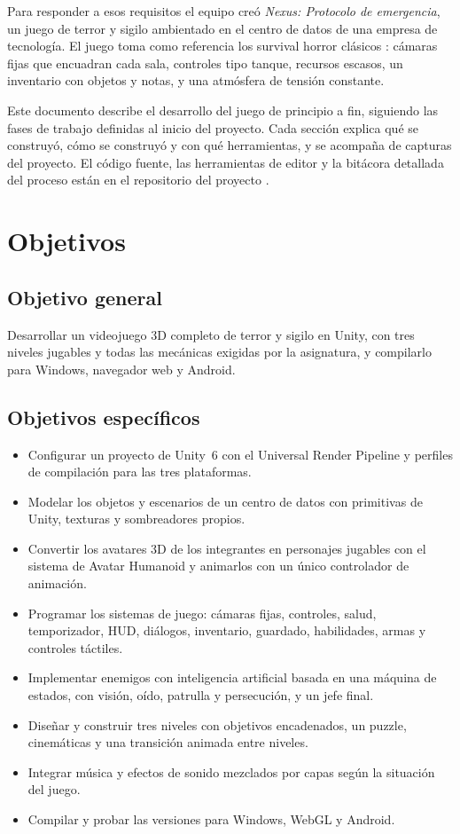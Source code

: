 \documentclass[stu,letterpaper,12pt,donotrepeattitle,floatsintext]{apa7}
\begin{document}
Para responder a esos requisitos el equipo creó \textit{Nexus: Protocolo de emergencia}, un juego
de terror y sigilo ambientado en el centro de datos de una empresa de tecnología. El juego toma como
referencia los survival horror clásicos \parencite{capcom1996,capcom1999,square1998}: cámaras fijas
que encuadran cada sala, controles tipo tanque, recursos escasos, un inventario con objetos y notas,
y una atmósfera de tensión constante.

Este documento describe el desarrollo del juego de principio a fin, siguiendo las fases de trabajo
definidas al inicio del proyecto. Cada sección explica qué se construyó, cómo se construyó y con qué
herramientas, y se acompaña de capturas del proyecto. El código fuente, las herramientas de editor y
la bitácora detallada del proceso están en el repositorio del proyecto \parencite{repositorio2026}.

\section{Objetivos}

\subsection{Objetivo general}

Desarrollar un videojuego 3D completo de terror y sigilo en Unity, con tres niveles jugables y todas
las mecánicas exigidas por la asignatura, y compilarlo para Windows, navegador web y Android.

\subsection{Objetivos específicos}

\begin{itemize}
  \item Configurar un proyecto de Unity~6 con el Universal Render Pipeline y perfiles de compilación
        para las tres plataformas.
  \item Modelar los objetos y escenarios de un centro de datos con primitivas de Unity, texturas y
        sombreadores propios.
  \item Convertir los avatares 3D de los integrantes en personajes jugables con el sistema de Avatar
        Humanoid y animarlos con un único controlador de animación.
  \item Programar los sistemas de juego: cámaras fijas, controles, salud, temporizador, HUD,
        diálogos, inventario, guardado, habilidades, armas y controles táctiles.
  \item Implementar enemigos con inteligencia artificial basada en una máquina de estados, con
        visión, oído, patrulla y persecución, y un jefe final.
  \item Diseñar y construir tres niveles con objetivos encadenados, un puzzle, cinemáticas y una
        transición animada entre niveles.
  \item Integrar música y efectos de sonido mezclados por capas según la situación del juego.
  \item Compilar y probar las versiones para Windows, WebGL y Android.
\end{itemize}
\end{document}
